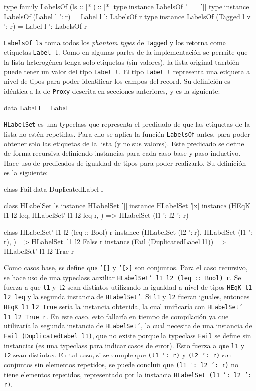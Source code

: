 \begin{code}
type family LabelsOf (ls :: [*]) :: [*]
type instance LabelsOf '[] = '[]
type instance LabelsOf (Label l ': r) = 
  Label l ': LabelsOf r
type instance LabelsOf (Tagged l v ': r) = 
  Label l ': LabelsOf r
\end{code}

\texttt{LabelsOf ls} toma todos los \textit{phantom types} de \texttt{Tagged} y los retorna como etiquetas \texttt{Label l}. Como en algunas partes de la implementación se permite que la lista heterogénea tenga solo etiquetas (sin valores), la lista original también puede tener un valor del tipo \texttt{Label l}. El tipo \texttt{Label l} representa una etiqueta a nivel de tipos para poder identificar los campos del record. Su definición es idéntica a la de \texttt{Proxy} descrita en secciones anteriores, y es la siguiente:

\begin{code}
data Label l = Label
\end{code}

\texttt{HLabelSet} es una typeclass que representa el predicado de que las etiquetas de la lista no estén repetidas. Para ello se aplica la función \texttt{LabelsOf} antes, para poder obtener solo las etiquetas de la lista (y no sus valores). Este predicado se define de forma recursiva definiendo instancias para cada caso base y paso inductivo. Hace uso de predicados de igualdad de tipos para poder realizarlo. Su definición es la siguiente:

\begin{code}
class Fail
data DuplicatedLabel l

class HLabelSet ls
instance HLabelSet '[]
instance HLabelSet '[x]
instance (HEqK l1 l2 leq, 
  HLabelSet' l1 l2 leq r,
  ) => HLabelSet (l1 ': l2 ': r)

class HLabelSet' l1 l2 (leq :: Bool) r
instance (HLabelSet (l2 ': r),
  HLabelSet (l1 ': r),
  ) => HLabelSet' l1 l2 False r
instance (Fail (DuplicatedLabel l1)) =>
  HLabelSet' l1 l2 True r
\end{code}

Como casos base, se define que \texttt{'[]} y \texttt{'[x]} son conjuntos. Para el caso recursivo, se hace uso de una typeclass auxiliar \texttt{HLabelSet' l1 l2 (leq :: Bool) r}. Se fuerza a que \texttt{l1} y \texttt{l2} sean distintos utilizando la igualdad a nivel de tipos \texttt{HEqK l1 l2 leq} y la segunda instancia de \texttt{HLabelSet'}. Si \texttt{l1} y \texttt{l2} fueran iguales, entonces \texttt{HEqK l1 l2 True} sería la instancia obtenida, la cual unificaría con \texttt{HLabelSet' l1 l2 True r}. En este caso, esto fallaría en tiempo de compilación ya que utilizaría la segunda instancia de \texttt{HLabelSet'}, la cual necesita de una instancia de \texttt{Fail (DuplicatedLabel l1)}, que no existe porque la typeclass \texttt{Fail} se define sin instancias (es una typeclass para indicar casos de error). Esto fuerza a que \texttt{l1} y \texttt{l2} sean distintos. En tal caso, si se cumple que \texttt{(l1 ': r)} y \texttt{(l2 ': r)} son conjuntos sin elementos repetidos, se puede concluir que \texttt{(l1 ': l2 ': r)} no tiene elementos repetidos, representado por la instancia \texttt{HLabelSet (l1 ': l2 ': r)}.

